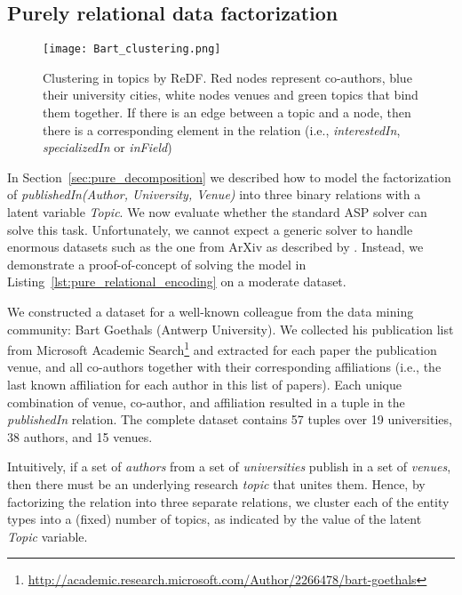 \subsection{Purely relational data factorization}
\label{subsec:solvingrelational}

\begin{figure}[tbh]
  \centering
  \texttt{[image: Bart\_clustering.png]}
  \captionsetup{skip=-0pt}
  \caption{Clustering in topics by ReDF. Red nodes represent co-authors, blue their university cities, white nodes venues and green topics that bind them  together. If there is an edge between a topic and a node, then there is a corresponding element in the relation (i.e., \textit{interestedIn}, \textit{specializedIn} or \textit{inField}) }
  \label{figure:purely_relational_decomposition}
\end{figure}

In Section~\ref{sec:pure_decomposition} we described how to model the factorization of \textit{publishedIn(Author, University, Venue)} into three binary relations with a latent variable \textit{Topic}. We now evaluate whether the standard ASP solver can solve this task. Unfortunately, we cannot expect a generic solver to handle enormous datasets such as the one from ArXiv as described by \cite{Gopalan2013Efficient}. Instead, we demonstrate a proof-of-concept of solving the model in Listing~\ref{lst:pure_relational_encoding} on a moderate dataset.

We constructed a dataset for a well-known colleague from the data mining community: Bart Goethals (Antwerp University). We collected his publication list from Microsoft Academic Search\footnote{\scriptsize{\url{http://academic.research.microsoft.com/Author/2266478/bart-goethals}}} and extracted for each paper the publication venue, and all co-authors together with their corresponding affiliations (i.e., the last known affiliation for each author in this list of papers). Each unique combination of venue, co-author, and affiliation resulted in a tuple in the \textit{publishedIn} relation. The complete dataset contains 57 tuples over 19 universities, 38 authors, and 15 venues.

Intuitively, if a set of \emph{authors} from a set of \emph{universities} publish in a set of \emph{venues}, then there must be an underlying research \emph{topic} that unites them. Hence, by factorizing the relation into three separate relations, we cluster each of the entity types into a (fixed) number of topics, as indicated by the value of the latent \textit{Topic} variable.

